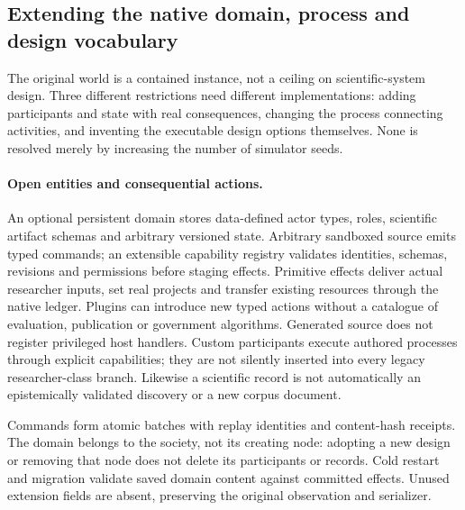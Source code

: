 \subsection{Extending the native domain, process and design vocabulary}
\label{sec:open-native-v7}

The original world is a contained instance, not a ceiling on scientific-system
design. Three different restrictions need different implementations: adding
participants and state with real consequences, changing the process connecting
activities, and inventing the executable design options themselves. None is
resolved merely by increasing the number of simulator seeds.

\paragraph{Open entities and consequential actions.}
An optional persistent domain stores data-defined actor types, roles, scientific
artifact schemas and arbitrary versioned state. Arbitrary sandboxed source emits
typed commands; an extensible capability registry validates identities, schemas,
revisions and permissions before staging effects. Primitive effects deliver
actual researcher inputs, set real projects and transfer existing resources
through the native ledger. Plugins can introduce new typed actions without a
catalogue of evaluation, publication or government algorithms. Generated source
does not register privileged host handlers. Custom participants execute authored
processes through explicit capabilities; they are not silently inserted into
every legacy researcher-class branch. Likewise a scientific record is not
automatically an epistemically validated discovery or a new corpus document.

Commands form atomic batches with replay identities and content-hash receipts.
The domain belongs to the society, not its creating node: adopting a new design
or removing that node does not delete its participants or records. Cold restart
and migration validate saved domain content against committed effects. Unused
extension fields are absent, preserving the original observation and serializer.

